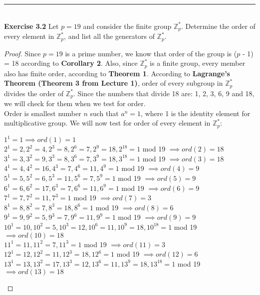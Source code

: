 \documentclass[a4paper]{article}
\begin{document}
\noindent\rule{12cm}{0.4pt}\\
\noindent \textbf{Exercise 3.2} Let $p = 19$ and consider the finite group $\mathbb{Z}^{*}_{p}$. Determine the order of every element in $\mathbb{Z}^{*}_{p}$, and list all the generators of $\mathbb{Z}^{*}_{p}$.
\begin{proof}
Since $p=19$ is a prime number, we know that order of the group is ($p$ - 1) = 18 according to \textbf{Corollary 2}. Also, since $\mathbb{Z}^{*}_{p}$ is a finite group, every member also has finite order, according to \textbf{Theorem 1}. According to \textbf{Lagrange's Theorem (Theorem 3 from Lecture 1)}, order of every subgroup in $\mathbb{Z}^{*}_{p}$ divides the order of $\mathbb{Z}^{*}_{p}$. Since the numbers that divide 18 are: 1, 2, 3, 6, 9 and 18, we will check for them when we test for order.\\
Order is smallest number $n$ such that $a^n=1$, where 1 is the identity element for multiplicative group. We will now test for order of every element in $\mathbb{Z}^{*}_{p}$:\\
\begin{center}
$1^1 = 1 \implies ord(1) = 1$\\
$2^1 = 2, 2^2 = 4, 2^3 = 8, 2^6 = 7, 2^9 = 18, 2^{18} = 1$ mod 19 $\implies ord(2) = 18$\\
$3^1 = 3, 3^2 = 9, 3^3 = 8, 3^6 = 7, 3^9 = 18, 3^{18} = 1$ mod 19 $\implies ord(3) = 18$\\
$4^1 = 4, 4^2 = 16, 4^3 = 7, 4^6 = 11, 4^9 = 1$ mod 19 $\implies ord(4) = 9$\\
$5^1 = 5, 5^2 = 6, 5^3 = 11, 5^6 = 7, 5^9 = 1$ mod 19 $\implies ord(5) = 9$\\
$6^1 = 6, 6^2 = 17, 6^3 = 7, 6^6 = 11, 6^9 = 1$ mod 19 $\implies ord(6) = 9$\\
$7^1 = 7, 7^2 = 11, 7^3 = 1$ mod 19 $\implies ord(7) = 3$\\
$8^1 = 8, 8^2 = 7, 8^3 = 18, 8^6 = 1$ mod 19 $\implies ord(8) = 6$\\
$9^1 = 9, 9^2 = 5, 9^3 = 7, 9^6 = 11, 9^9 = 1$ mod 19 $\implies ord(9) = 9$\\
$10^1 = 10, 10^2 = 5, 10^3 = 12, 10^6 = 11, 10^9 = 18, 10^{18} = 1$ mod 19 $\implies ord(10) = 18$\\
$11^1 = 11, 11^2 = 7, 11^3 = 1$ mod 19 $\implies ord(11) = 3$\\
$12^1 = 12, 12^2 = 11, 12^3 = 18, 12^6 = 1$ mod 19 $\implies ord(12) = 6$\\
$13^1 = 13, 13^2 = 17, 13^3 = 12, 13^6 = 11, 13^9 = 18, 13^{18} = 1$ mod 19 $\implies ord(13) = 18$\\

\end{center}
\end{proof}
\end{document}
